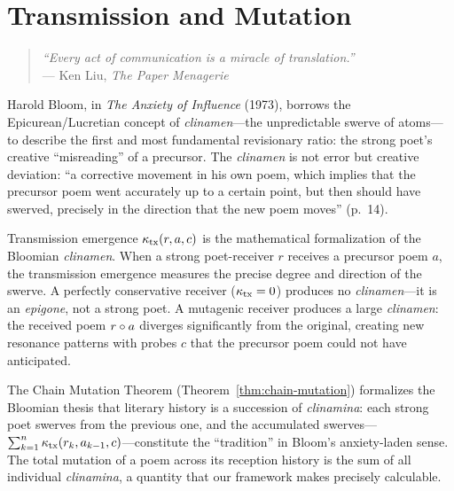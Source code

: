 
\chapter{Transmission and Mutation}

\begin{quote}
\textit{``Every act of communication is a miracle of translation.''}\\
\hfill --- Ken Liu, \textit{The Paper Menagerie}
\end{quote}

\begin{interpretation}\label{interp:ch7:bloom_clinamen}
Harold Bloom, in \emph{The Anxiety of Influence} (1973), borrows the
Epicurean/Lucretian concept of \emph{clinamen}---the unpredictable swerve
of atoms---to describe the first and most fundamental revisionary ratio:
the strong poet's creative ``misreading'' of a precursor. The \emph{clinamen}
is not error but creative deviation: ``a corrective movement in his own
poem, which implies that the precursor poem went accurately up to a certain
point, but then should have swerved, precisely in the direction that the new
poem moves'' (p.~14).

Transmission emergence $\kappa_{\text{tx}}(r, a, c)$ is the mathematical
formalization of the Bloomian \emph{clinamen}. When a strong poet-receiver
$r$ receives a precursor poem $a$, the transmission emergence measures
the precise degree and direction of the swerve. A perfectly conservative
receiver ($\kappa_{\text{tx}} = 0$) produces no \emph{clinamen}---it is
an \emph{epigone}, not a strong poet. A mutagenic receiver produces a
large \emph{clinamen}: the received poem $r \circ a$ diverges
significantly from the original, creating new resonance patterns with
probes $c$ that the precursor poem could not have anticipated.

The Chain Mutation Theorem (Theorem~\ref{thm:chain-mutation}) formalizes
the Bloomian thesis that literary history is a succession of
\emph{clinamina}: each strong poet swerves from the previous one, and
the accumulated swerves---$\sum_{k=1}^n \kappa_{\text{tx}}(r_k, a_{k-1},
c)$---constitute the ``tradition'' in Bloom's anxiety-laden sense.
The total mutation of a poem across its reception history is the sum of
all individual \emph{clinamina}, a quantity that our framework makes
precisely calculable.
\end{interpretation}

